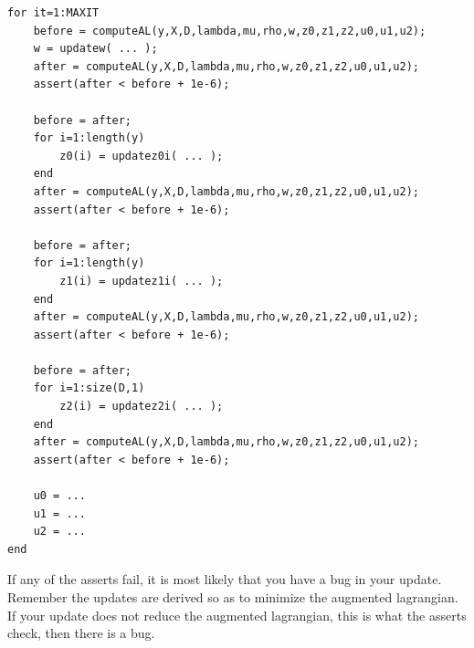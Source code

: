 \documentclass{article}
\begin{document}
{\begin{verbatim}
for it=1:MAXIT
    before = computeAL(y,X,D,lambda,mu,rho,w,z0,z1,z2,u0,u1,u2);
    w = updatew( ... );
    after = computeAL(y,X,D,lambda,mu,rho,w,z0,z1,z2,u0,u1,u2);
    assert(after < before + 1e-6);

    before = after;
    for i=1:length(y)
        z0(i) = updatez0i( ... );
    end
    after = computeAL(y,X,D,lambda,mu,rho,w,z0,z1,z2,u0,u1,u2);
    assert(after < before + 1e-6);

    before = after;
    for i=1:length(y)
        z1(i) = updatez1i( ... );
    end
    after = computeAL(y,X,D,lambda,mu,rho,w,z0,z1,z2,u0,u1,u2);
    assert(after < before + 1e-6);

    before = after;
    for i=1:size(D,1)
        z2(i) = updatez2i( ... );
    end
    after = computeAL(y,X,D,lambda,mu,rho,w,z0,z1,z2,u0,u1,u2);
    assert(after < before + 1e-6);

    u0 = ...
    u1 = ...
    u2 = ...
end
\end{verbatim}
If any of the asserts fail, it is most likely that you have a bug in your update. Remember the updates are derived so as to minimize the augmented lagrangian. If your update does not reduce the augmented lagrangian, this is what the asserts check, then there is a bug.

}
\end{document}
